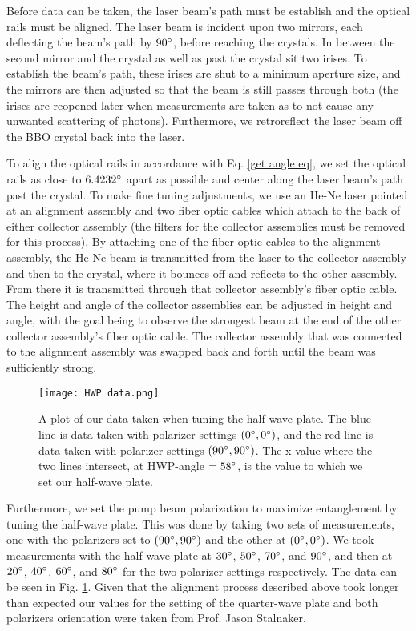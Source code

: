 \documentclass[11pt,letterpaper]{article}
\begin{document}
Before data can be taken, the laser beam's path must be establish and the optical rails must be aligned. The laser beam is incident upon two mirrors, each deflecting the beam's path by $90\degree$, before reaching the crystals. In between the second mirror and the crystal as well as past the crystal sit two irises. To establish the beam's path, these irises are shut to a minimum aperture size, and the mirrors are then adjusted so that the beam is still passes through both (the irises are reopened later when measurements are taken as to not cause any unwanted scattering of photons). Furthermore, we retroreflect the laser beam off the BBO crystal back into the laser.

To align the optical rails in accordance with Eq. \ref{get angle eq}, we set the optical rails as close to $6.4232\degree$ apart as possible and center along the laser beam's path past the crystal. To make fine tuning adjustments, we use an He-Ne laser pointed at an alignment assembly and two fiber optic cables which attach to the back of either collector assembly (the filters for the collector assemblies must be removed for this process). By attaching one of the fiber optic cables to the alignment assembly, the He-Ne beam is transmitted from the laser to the collector assembly and then to the crystal, where it bounces off and reflects to the other assembly. From there it is transmitted through that collector assembly's fiber optic cable. The height and angle of the collector assemblies can be adjusted in height and angle, with the goal being to observe the strongest beam at the end of the other collector assembly's fiber optic cable. The collector assembly that was connected to the alignment assembly was swapped back and forth until the beam was sufficiently strong.

\begin{figure}
\centerline{\texttt{[image: HWP data.png]}}
\caption{A plot of our data taken when tuning the half-wave plate. The blue line is data taken with polarizer settings $(0\degree, 0\degree)$, and the red line is data taken with polarizer settings $(90\degree, 90\degree)$. The x-value where the two lines intersect, at HWP-angle $= 58\degree$, is the value to which we set our half-wave plate.} \label{HWP tuning}
\end{figure}

Furthermore, we set the pump beam polarization to maximize entanglement by tuning the half-wave plate. This was done by taking two sets of measurements, one with the polarizers set to $(90\degree, 90\degree)$ and the other at $(0\degree, 0\degree)$. We took measurements with the half-wave plate at $30\degree$, $50\degree$, $70\degree$, and $90\degree$, and then at $20\degree$, $40\degree$, $60\degree$, and $80\degree$ for the two polarizer settings respectively. The data can be seen in Fig. \ref{HWP tuning}. Given that the alignment process described above took longer than expected our values for the setting of the quarter-wave plate and both polarizers orientation were taken from Prof. Jason Stalnaker.
\end{document}
